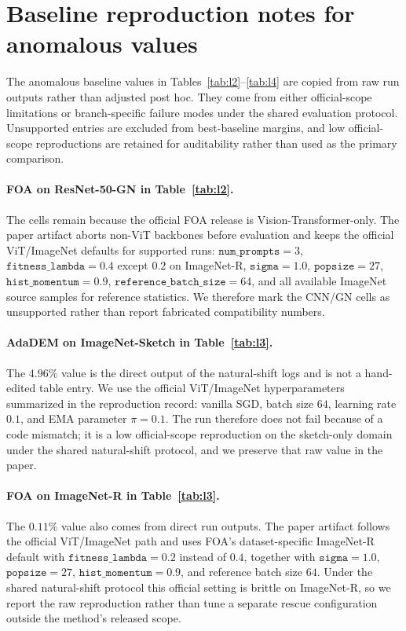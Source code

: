 \section{Baseline reproduction notes for anomalous values}
\label{app:reproduction_notes}

The anomalous baseline values in Tables~\ref{tab:l2}--\ref{tab:l4} are copied from raw run outputs rather than adjusted post hoc. They come from either official-scope limitations or branch-specific failure modes under the shared evaluation protocol. Unsupported entries are excluded from best-baseline margins, and low official-scope reproductions are retained for auditability rather than used as the primary comparison.

\paragraph{FOA on ResNet-50-GN in Table~\ref{tab:l2}.}
The cells remain \pending because the official FOA release is Vision-Transformer-only. The paper artifact aborts non-ViT backbones before evaluation and keeps the official ViT/ImageNet defaults for supported runs: $\texttt{num\_prompts}=3$, $\texttt{fitness\_lambda}=0.4$ except $0.2$ on ImageNet-R, $\texttt{sigma}=1.0$, $\texttt{popsize}=27$, $\texttt{hist\_momentum}=0.9$, $\texttt{reference\_batch\_size}=64$, and all available ImageNet source samples for reference statistics. We therefore mark the CNN/GN cells as unsupported rather than report fabricated compatibility numbers.

\paragraph{AdaDEM on ImageNet-Sketch in Table~\ref{tab:l3}.}
The $4.96\%$ value is the direct output of the natural-shift logs and is not a hand-edited table entry. We use the official ViT/ImageNet hyperparameters summarized in the reproduction record: vanilla SGD, batch size $64$, learning rate $0.1$, and EMA parameter $\pi=0.1$. The run therefore does not fail because of a code mismatch; it is a low official-scope reproduction on the sketch-only domain under the shared natural-shift protocol, and we preserve that raw value in the paper.

\paragraph{FOA on ImageNet-R in Table~\ref{tab:l3}.}
The $0.11\%$ value also comes from direct run outputs. The paper artifact follows the official ViT/ImageNet path and uses FOA's dataset-specific ImageNet-R default with $\texttt{fitness\_lambda}=0.2$ instead of $0.4$, together with $\texttt{sigma}=1.0$, $\texttt{popsize}=27$, $\texttt{hist\_momentum}=0.9$, and reference batch size $64$. Under the shared natural-shift protocol this official setting is brittle on ImageNet-R, so we report the raw reproduction rather than tune a separate rescue configuration outside the method's released scope.

